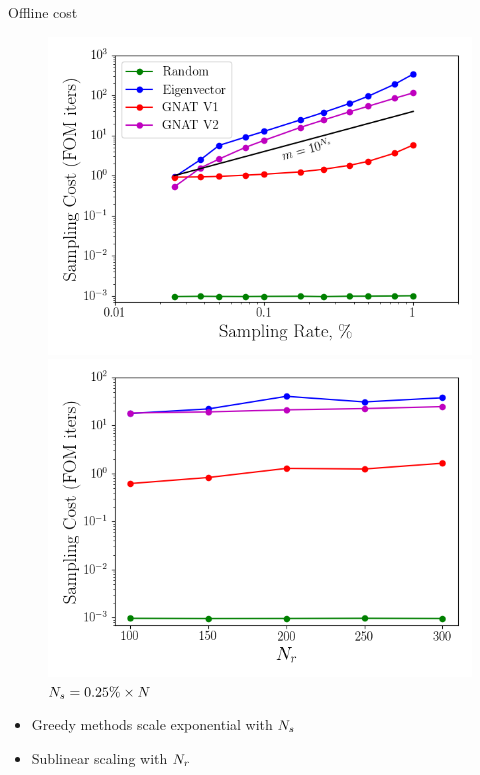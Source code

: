 \documentclass[]{beamer}
\begin{document}
\begin{frame}{Offline cost}
	\begin{figure}
		\begin{minipage}{0.49\linewidth}
			\includegraphics[width=0.99\linewidth]{Images/experiments/cvrc/samp_timing_wrt_samprate.png}
			\caption*{$\numResModes = 300$}
		\end{minipage}
		\begin{minipage}{0.49\linewidth}
			\includegraphics[width=0.99\linewidth]{Images/experiments/cvrc/samp_timing_wrt_modes.png}
			\caption*{$N_s = 0.25\% \times N$}
		\end{minipage}
	\end{figure}
	\begin{itemize}
		\item Greedy methods scale exponential with $N_s$
		\item Sublinear scaling with $N_r$
	\end{itemize}
\end{frame}
\end{document}
